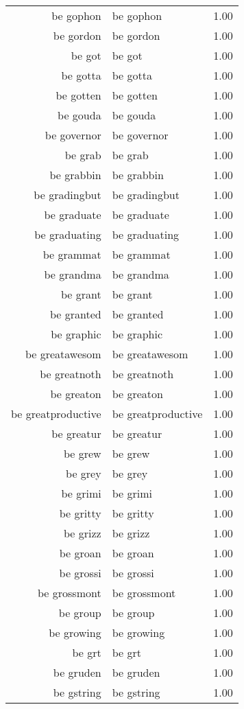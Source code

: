 \begin{table}[ht]
\begin{tabular}{rlr}
  be gophon & be gophon & 1.00 \\ 
  be gordon & be gordon & 1.00 \\ 
  be got & be got & 1.00 \\ 
  be gotta & be gotta & 1.00 \\ 
  be gotten & be gotten & 1.00 \\ 
  be gouda & be gouda & 1.00 \\ 
  be governor & be governor & 1.00 \\ 
  be grab & be grab & 1.00 \\ 
  be grabbin & be grabbin & 1.00 \\ 
  be gradingbut & be gradingbut & 1.00 \\ 
  be graduate & be graduate & 1.00 \\ 
  be graduating & be graduating & 1.00 \\ 
  be grammat & be grammat & 1.00 \\ 
  be grandma & be grandma & 1.00 \\ 
  be grant & be grant & 1.00 \\ 
  be granted & be granted & 1.00 \\ 
  be graphic & be graphic & 1.00 \\ 
  be greatawesom & be greatawesom & 1.00 \\ 
  be greatnoth & be greatnoth & 1.00 \\ 
  be greaton & be greaton & 1.00 \\ 
  be greatproductive & be greatproductive & 1.00 \\ 
  be greatur & be greatur & 1.00 \\ 
  be grew & be grew & 1.00 \\ 
  be grey & be grey & 1.00 \\ 
  be grimi & be grimi & 1.00 \\ 
  be gritty & be gritty & 1.00 \\ 
  be grizz & be grizz & 1.00 \\ 
  be groan & be groan & 1.00 \\ 
  be grossi & be grossi & 1.00 \\ 
  be grossmont & be grossmont & 1.00 \\ 
  be group & be group & 1.00 \\ 
  be growing & be growing & 1.00 \\ 
  be grt & be grt & 1.00 \\ 
  be gruden & be gruden & 1.00 \\ 
  be gstring & be gstring & 1.00 \\ 

\end{tabular}
\end{table}
